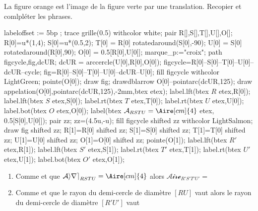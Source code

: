\begin{exercice*}
    La figure orange est l'image de la figure verte par une translation. Recopier et comlpléter les phrases.
    \begin{Geometrie}[CoinHD={(8u,5u)}]
        labeloffset := 5bp ;
        trace grille(0.5) withcolor white;
        pair R[],S[],T[],U[],O[];
        R[0]=u*(1,4);
        S[0]=u*(0.5,2);
        T[0] = R[0] rotatedaround(S[0],-90);
        U[0] = S[0] rotatedaround(R[0],90);
        O[0] = 0.5[R[0],U[0]];
        marque_p:="croix";
        path figcycle,fig,dcUR;        
        dcUR = arccercle(U[0],R[0],O[0]);
        figcycle=R[0]--S[0]--T[0]--U[0]--dcUR--cycle;
        fig=R[0]--S[0]--T[0]--U[0]--dcUR--U[0];
        fill figcycle withcolor LightGreen;
        pointe(O[0]);
        draw fig;
        drawdblarrow O[0]--pointarc(dcUR,125);
        draw appelation(O[0],pointarc(dcUR,125),-2mm,btex \small {} etex);
        label.lft(btex $R$ etex,R[0]);
        label.lft(btex $S$ etex,S[0]);
        label.rt(btex $T$ etex,T[0]);
        label.rt(btex $U$ etex,U[0]);
        label.bot(btex $O$ etex,O[0]);
        label(btex \footnotesize $\mathcal{A}_{RSTU}=\Aire[cm]{4}$ etex, 0.5[S[0],U[0]]);
        pair zz;
        zz=(4.5u,-u);
        fill figcycle shifted zz withcolor LightSalmon;
        draw fig shifted zz;
        R[1]=R[0] shifted zz;
        S[1]=S[0] shifted zz;
        T[1]=T[0] shifted zz;
        U[1]=U[0] shifted zz;
        O[1]=O[0] shifted zz;
        pointe(O[1]);        
        label.lft(btex $R'$ etex,R[1]);
        label.lft(btex $S'$ etex,S[1]);
        label.rt(btex $T'$ etex,T[1]);
        label.rt(btex $U'$ etex,U[1]);
        label.bot(btex $O'$ etex,O[1]);
\end{Geometrie}
    \begin{enumerate}
        \item Comme \makebox[0.1\linewidth]{\dotfill} et que $\mathcal{Aire}_{RSTU}=\Aire[cm]{4}$ alors $\mathcal{Aire}_{R'S'T'U'}=$\makebox[0.1\linewidth]{\dotfill}
        \item Comme \makebox[0.1\linewidth]{\dotfill} et que le rayon du demi-cercle de diamètre $[RU]$ vaut  alors le rayon du demi-cercle de diamètre $[R'U']$ vaut\makebox[0.1\linewidth]{\dotfill}
    \end{enumerate}
\end{exercice*}

